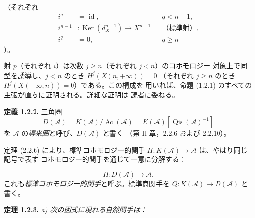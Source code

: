 \clearpage
{}%
\begingroup\small\setlength{\parskip}{0pt}\setlength{\emergencystretch}{1.5em}
\setlength{\abovedisplayskip}{4pt plus 2pt minus 2pt}%
\setlength{\belowdisplayskip}{4pt plus 2pt minus 2pt}%

\noindent（それぞれ
\[
\begin{aligned}
i^q&=\operatorname{id},&&q<n-1,\\
i^{n-1}&\colon\operatorname{Ker}(d_X^{n-1})\longrightarrow X^{n-1}
  &&\text{（標準射）},\\
i^q&=0,&&q\geq n
\end{aligned}
\]
）。

射 $p$（それぞれ $i$）は次数 $j\geq n$（それぞれ $j<n$）のコホモロジー
対象上で同型を誘導し、$j<n$ のとき $H^j(X(n,+\infty))=0$
（それぞれ $j\geq n$ のとき $H^j(X(-\infty,n))=0$）である。この構成を
用いれば、命題 (1.2.1) のすべての主張が直ちに証明される。詳細な証明は
読者に委ねる。

\medskip\noindent\textbf{定義 1.2.2.}\quad
三角圏
\[
D(\mathcal A)=K(\mathcal A)/\operatorname{Ac}(\mathcal A)
=K(\mathcal A)[\operatorname{Qis}(\mathcal A)^{-1}]
\]
を $\mathcal A$ の\emph{導来圏}と呼び、$D(\mathcal A)$ と書く
（第 II 章，2.2.6 および 2.2.10）。

定理 (2.2.6) により、標準コホモロジー的関手
$H\colon K(\mathcal A)\longrightarrow\mathcal A$ は、やはり同じ記号で表す
コホモロジー的関手を通じて一意に分解する：

\begin{equation}
H\colon D(\mathcal A)\longrightarrow\mathcal A.
\tag{1.2.2.1}
\end{equation}
これも\emph{標準コホモロジー的関手}と呼ぶ。標準商関手を
$Q\colon K(\mathcal A)\longrightarrow D(\mathcal A)$ と書く。

\medskip\noindent\textbf{定理 1.2.3.}\quad
\textit{a) 次の図式に現れる自然関手は：}

\begin{center}
\end{center}
\endgroup
